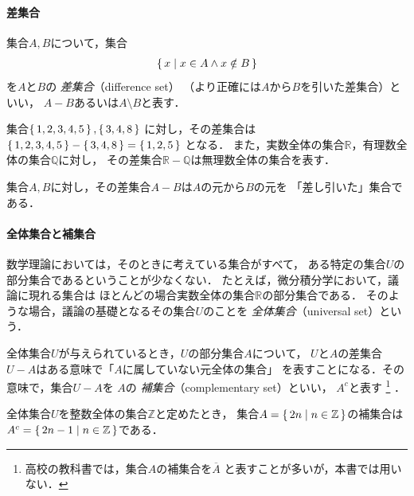    \paragraph{差集合}
   集合$A,  B$について，集合
   \begin{align}
     \set{ x \mid  x \in A \land x \notin B}
     \label{eq:differenceset}
   \end{align}
   を$A$と$B$の
   \emph{差集合}（difference set）
   （より正確には$A$から$B$を引いた差集合）といい，
   $A -B$あるいは$A \setminus B$と表す．
   \begin{ex} \label{ex:setminus}
     集合$\set{1,  2,  3,  4,  5},  \set{3,  4,  8}$
     に対し，その差集合は
     $\set{1,  2,  3,  4,  5} - \set{3,  4,  8} = \set{1,  2,  5}$
     となる．
     また，実数全体の集合$\mathbb{R}$，有理数全体の集合$\mathbb{Q}$に対し，
     その差集合$\mathbb{R} - \mathbb{Q}$は無理数全体の集合を表す．
   \end{ex}

   集合$A,  B$に対し，その差集合$A-B$は$A$の元から$B$の元を
   「差し引いた」集合である．

   \paragraph{全体集合と補集合}
   数学理論においては，そのときに考えている集合がすべて，
   ある特定の集合$U$の部分集合であるということが少なくない．
   たとえば，微分積分学において，議論に現れる集合は
   ほとんどの場合実数全体の集合$\mathbb{R}$の部分集合である．
   そのような場合，議論の基礎となるその集合$U$のことを
   \emph{全体集合}（universal set）という．

   全体集合$U$が与えられているとき，$U$の部分集合$A$について，
   $U$と$A$の差集合$U-A$はある意味で「$A$に属していない元全体の集合」
   を表すことになる．その意味で，集合$U-A$を
   $A$の
   \emph{補集合}（complementary set）といい，
   $A^c$と表す
   \footnote{高校の教科書では，集合$A$の補集合を$\overline{A}$
             と表すことが多いが，本書では用いない．}
   ．
   \begin{ex} \label{ex:complement}
     全体集合$U$を整数全体の集合$\mathbb{Z}$と定めたとき，
     集合$A = \set{ 2n \mid  n \in \mathbb{Z}}$の補集合は
     $A^c = \set{ 2n-1 \mid  n \in \mathbb{Z}}$である．
   \end{ex}
   
